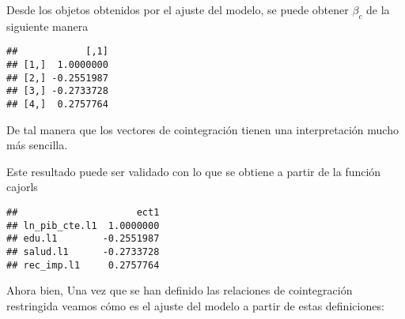 \documentclass[]{book}
\newenvironment{Shaded}{\begin{snugshade}}{\end{snugshade}}
\newcommand{\KeywordTok}[1]{\textcolor[rgb]{0.13,0.29,0.53}{\textbf{#1}}}
\newcommand{\DataTypeTok}[1]{\textcolor[rgb]{0.13,0.29,0.53}{#1}}
\newcommand{\DecValTok}[1]{\textcolor[rgb]{0.00,0.00,0.81}{#1}}
\newcommand{\StringTok}[1]{\textcolor[rgb]{0.31,0.60,0.02}{#1}}
\newcommand{\OperatorTok}[1]{\textcolor[rgb]{0.81,0.36,0.00}{\textbf{#1}}}
\newcommand{\NormalTok}[1]{#1}
\theoremstyle{definition}
\theoremstyle{definition}
\theoremstyle{definition}
\theoremstyle{remark}
\begin{document}
Desde los objetos obtenidos por el ajuste del modelo, se puede obtener
\(\beta_c\) de la siguiente manera

\begin{Shaded}
\end{Shaded}

\begin{verbatim}
##            [,1]
## [1,]  1.0000000
## [2,] -0.2551987
## [3,] -0.2733728
## [4,]  0.2757764
\end{verbatim}

De tal manera que los vectores de cointegración tienen una
interpretación mucho más sencilla.

Este resultado puede ser validado con lo que se obtiene a partir de la
función cajorls

\begin{Shaded}
\end{Shaded}

\begin{verbatim}
##                     ect1
## ln_pib_cte.l1  1.0000000
## edu.l1        -0.2551987
## salud.l1      -0.2733728
## rec_imp.l1     0.2757764
\end{verbatim}

Ahora bien, Una vez que se han definido las relaciones de cointegración
restringida veamos cómo es el ajuste del modelo a partir de estas
definiciones:

\begin{Shaded}
\end{Shaded}
\end{document}
